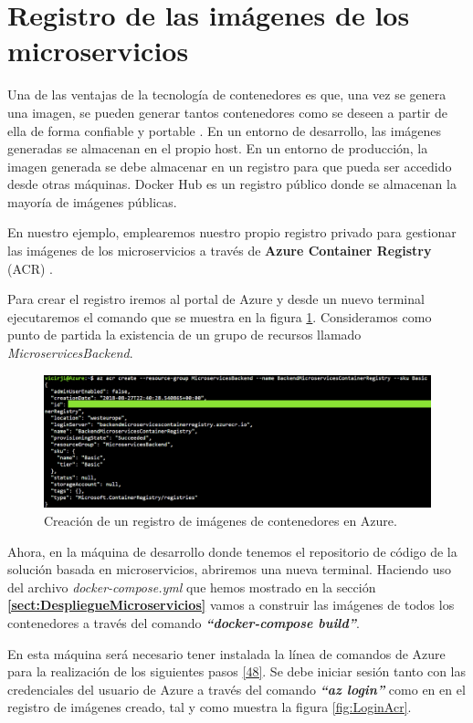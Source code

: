 \documentclass[11pt,spanish,listoffigures]{tfgetsinf}
\begin{document}
\section{Registro de las imágenes de los microservicios}

Una de las ventajas de la tecnología de contenedores es que, una vez se genera una imagen, se pueden generar tantos contenedores como se deseen a partir de ella de forma confiable y portable \cite{Matthias}. En un entorno de desarrollo, las imágenes generadas se almacenan en el propio host. En un entorno de producción, la imagen generada se debe almacenar en un registro para que pueda ser accedido desde otras máquinas. Docker Hub es un registro público donde se almacenan la mayoría de imágenes públicas.

En nuestro ejemplo, emplearemos nuestro propio registro privado para gestionar las imágenes de los microservicios a través de \textbf{Azure Container Registry} (ACR) \cite{DelaTorre2018}.

Para crear el registro iremos al portal de Azure y desde un nuevo terminal ejecutaremos el comando que se muestra en la figura \ref{fig:CreateACR}. Consideramos como punto de partida la existencia de un grupo de recursos llamado \textit{MicroservicesBackend}.

\begin{figure}[h]
\centering
\includegraphics[scale=0.50]{CreateACR}
\caption{Creación de un registro de imágenes de contenedores en Azure.}
\label{fig:CreateACR}
\end{figure}

Ahora, en la máquina de desarrollo donde tenemos el repositorio de código de la solución basada en microservicios, abriremos una nueva terminal. Haciendo uso del archivo \textit{docker-compose.yml} que hemos mostrado en la sección \textbf{\ref{sect:DespliegueMicroservicios} } vamos a construir las imágenes de todos los contenedores a través del comando \textit{\textbf{``docker-compose build''}}.

En esta máquina será necesario tener instalada la línea de comandos de Azure para la realización de los siguientes pasos 
\hyperlink{page.80}{[48]}. Se debe iniciar sesión tanto con las credenciales del usuario de Azure a través del comando \textit{\textbf{``az login''}} como en en el registro de imágenes creado, tal y como muestra la figura \ref{fig:LoginAcr}.
\end{document}
